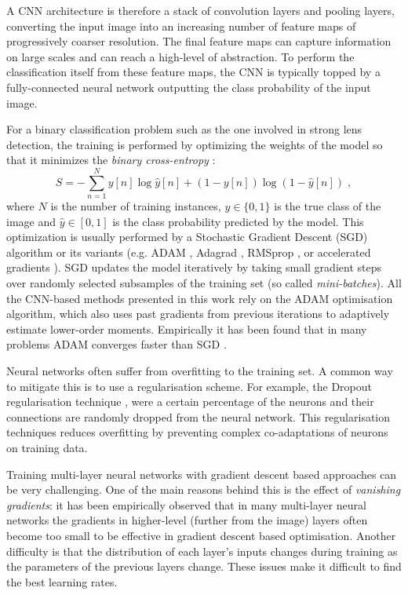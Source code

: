\documentclass{aa}
\begin{document}
A CNN architecture is therefore a stack of convolution layers and pooling layers, converting the input image into an increasing number of feature maps of progressively coarser resolution. The final feature maps can capture information on large scales and can reach a high-level of abstraction. To perform the classification itself from these feature maps, the CNN is typically topped by a fully-connected neural network outputting the class probability of the input image.

For a binary classification problem such as the one involved in strong lens detection, the training is performed by optimizing the weights of the model so that it  minimizes the \textit{binary cross-entropy} :
\begin{equation}
S =	- \sum_{n=1}^{N} y[n] \log \hat{y}[n] + (1 - y[n])\log(1 - \hat{y}[n]) \;,
\end{equation}
where $N$ is the number of training instances, $y \in \{0,1\}$ is the true class of the image and $\hat{y} \in [0,1]$ is the class probability predicted by the model. This optimization is usually performed by a Stochastic Gradient Descent (SGD) algorithm or its variants (e.g. ADAM \citep{Kingma_2014}, Adagrad \citep{duchi12adaptive}, RMSprop \citep{Tieleman12RMSProp}, or accelerated gradients \citep{nesterov83method}). SGD updates the model iteratively by taking small gradient steps over randomly selected subsamples of the training set (so called \textit{mini-batches}). All the CNN-based methods presented in this work rely on the ADAM optimisation algorithm, which also uses past gradients from previous iterations to adaptively estimate lower-order moments. Empirically it has been found that in many problems ADAM converges faster than SGD \citep{Ruder16overview}.

Neural networks often suffer from overfitting to the training set.  A common way to mitigate this is to use a regularisation scheme.  For example, the Dropout regularisation technique \citep{2012arXiv1207.0580H,JMLR:v15:srivastava14a}, were a certain percentage of the neurons and their connections are  randomly dropped  from the neural network. This regularisation techniques reduces overfitting  by preventing complex co-adaptations of neurons on training data. 

Training multi-layer neural networks with gradient descent based approaches can be very challenging. One of the main reasons behind this is the effect of \textit{vanishing gradients}: it has been empirically observed that in many multi-layer neural networks the gradients in higher-level (further from the image) layers often become too small to be effective in gradient descent based optimisation. Another difficulty is that the distribution of each layer's inputs changes during training as the parameters of the previous layers change. These issues make it difficult to find the best learning rates.
\end{document}
